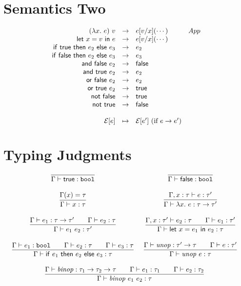 \documentclass[10pt]{article}
\begin{document}
\section{Semantics Two}

\[
  \begin{array}{rcll}
  \sstep  {(\lamdefe{x}{e})~v}      {\subst{x}{v}{e} (\cdots)}{App}\\
  \sstep  {\letdefe{x}{v}{e}}       {\subst{x}{v}{e} (\cdots)}\\
  \sstep  {\ife{\truev}{e_2}{e_3}}  {e_2}\\
  \sstep  {\ife{\falsev}{e_2}{e_3}} {e_3}\\
  \sstep  {\ande{\falsev}{e_2}}     {\falsev}\\
  \sstep  {\ande{\truev}{e_2}}      {e_2}\\
  \sstep  {\ore{\falsev}{e_2}}      {e_2}\\
  \sstep  {\ore{\truev}{e_2}}       {\truev}\\
  \sstep  {\note{\falsev}}          {\truev}\\
  \sstep  {\note{\truev}}           {\falsev}\\
  \\
  \ctxtstep {\InCtxt{e}}            {\InCtxt{e'} ~ (\text{if } e\ssosredex e')}\\
  \end{array}
\]

\section{Typing Judgments}

\[
  \begin{array}{cc}
    \infr{}{\envent{\truev}{\boolt}}
    &
    \infr{}{\envent{\falsev}{\boolt}}
    \\\\
    \envlookup{\typeEnv}{x}{\tau} 
    &
    \infr
      {\extenvent{x}{\tau}{e}{\tau'}}
      {\envent{\lamdefe{x}{e}}{\funct{\tau}{\tau'}}} 
    \\\\
    \infr
      {\envent{e_1}{\funct{\tau}{\tau'}} \iand 
       \envent{e_2}{\tau}}
      {\envent{e_1~e_2}{\tau'}} 
    &
    \infr
      {\extenvent{x}{\tau'}{e_2}{\tau} \iand
       \envent{e_1}{\tau'}}
      {\envent{\letdefe{x}{e_1}{e_2}}{\tau}}
    \\\\
      \infr
        {\envent{e_1}{\boolt} \iand \envent{e_2}{\tau} \iand \envent{e_3}{\tau}}
        {\envent{\ife{e_1}{e_2}{e_3}}{\tau}}
    &
    \infr
      {\envent{\unopdef}{\funct{\tau'}{\tau}} \iand
       \envent{e}{\tau'}}
      {\envent{\unope{e}}{\tau}}
    \\\\
    \multicolumn{2}{c}{ %
      \infr
        {\envent{\binopdef}{\funct{\tau_1}{\funct{\tau_2}{\tau}}} \iand
         \envent{e_1}{\tau_1}                                     \iand
         \envent{e_2}{\tau_2}}
        {\envent{\binope{e_1}{e_2}}{\tau}}
    }
    \\\\
  \end{array}
\]
\end{document}
